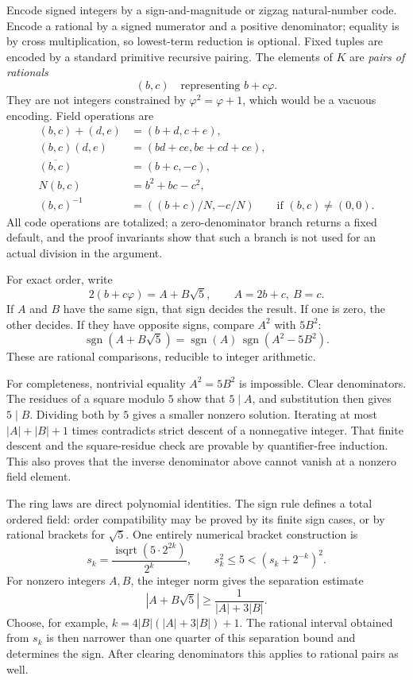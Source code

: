 \documentclass[11pt,a4paper]{article}
\newcommand{\ph}{\varphi}
\newcommand{\abs}[1]{\left|#1\right|}
\newcommand{\sgn}{\operatorname{sgn}}
\begin{document}
Encode signed integers by a sign-and-magnitude or zigzag natural-number code. Encode a rational by a signed numerator and a positive denominator; equality is by cross multiplication, so lowest-term reduction is optional. Fixed tuples are encoded by a standard primitive recursive pairing. The elements of $K$ are \emph{pairs of rationals}
\[
 (b,c)\quad\text{representing }b+c\ph.
\]
They are not integers constrained by $\ph^2=\ph+1$, which would be a vacuous encoding. Field operations are
\begin{align*}
 (b,c)+(d,e)&=(b+d,c+e),\\
 (b,c)(d,e)&=(bd+ce,be+cd+ce),\\
 \overline{(b,c)}&=(b+c,-c),\\
 N(b,c)&=b^2+bc-c^2,\\
 (b,c)^{-1}&=((b+c)/N,-c/N)\qquad\text{if }(b,c)\ne(0,0).
\end{align*}
All code operations are totalized; a zero-denominator branch returns a fixed default, and the proof invariants show that such a branch is not used for an actual division in the argument.

For exact order, write
\[
 2(b+c\ph)=A+B\sqrt5,\qquad A=2b+c,\ B=c.
\]
If $A$ and $B$ have the same sign, that sign decides the result. If one is zero, the other decides. If they have opposite signs, compare $A^2$ with $5B^2$:
\[
 \sgn(A+B\sqrt5)=\sgn(A)\,\sgn(A^2-5B^2).
\]
These are rational comparisons, reducible to integer arithmetic.

For completeness, nontrivial equality $A^2=5B^2$ is impossible. Clear denominators. The residues of a square modulo $5$ show that $5\mid A$, and substitution then gives $5\mid B$. Dividing both by $5$ gives a smaller nonzero solution. Iterating at most $\abs A+\abs B+1$ times contradicts strict descent of a nonnegative integer. That finite descent and the square-residue check are provable by quantifier-free induction. This also proves that the inverse denominator above cannot vanish at a nonzero field element.

The ring laws are direct polynomial identities. The sign rule defines a total ordered field: order compatibility may be proved by its finite sign cases, or by rational brackets for $\sqrt5$. One entirely numerical bracket construction is
\[
 s_k=\frac{\operatorname{isqrt}(5\cdot2^{2k})}{2^k},\qquad
 s_k^2\le5<(s_k+2^{-k})^2.
\]
For nonzero integers $A,B$, the integer norm gives the separation estimate
\[
 \abs{A+B\sqrt5}\ge\frac1{\abs A+3\abs B}.
\]
Choose, for example, $k=4\abs B(\abs A+3\abs B)+1$. The rational interval obtained from $s_k$ is then narrower than one quarter of this separation bound and determines the sign. After clearing denominators this applies to rational pairs as well.
\end{document}
